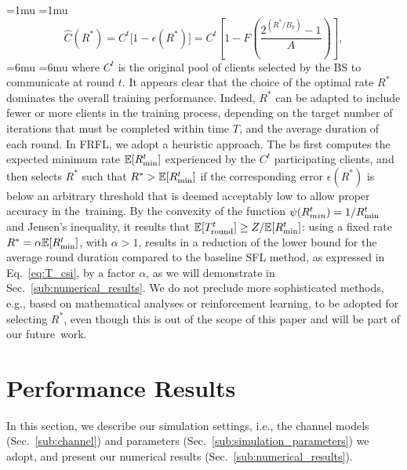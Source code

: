 \documentclass[10pt, conference, letterpaper]{IEEEtran}
\begin{document}
	\medmuskip=1mu
	\thickmuskip=1mu
	\begin{equation}
		\hat{C}(R^*) =C^t\Big[1-\epsilon(R^*)\Big]= C^t  \left[1-F\left(\frac{2^{(R^*/B_k)} -1}{A}\right)\right],
	\end{equation} 
	\medmuskip=6mu
	\thickmuskip=6mu
	where $C^t$ is the original pool of clients selected by the BS to communicate at round $t$.
	It appears clear that the choice of the optimal rate $R^*$ dominates the overall training performance.
	Indeed, $R^*$ can be adapted to include fewer or more clients in the training process, depending on the target number of iterations that must be completed within time $T$, and the average duration of each round. 
	In FRFL, we adopt a heuristic approach. The \gls{bs} first computes the expected minimum rate $\mathbb{E}[R_{\rm min}^t]$ experienced by the $C^t$ participating clients, and then selects $R^*$ such that $R^* >  \mathbb{E}[R_{\rm min}^t]$ if the corresponding error $\epsilon(R^*)$ is below an arbitrary threshold that is deemed acceptably low to allow proper accuracy in the~training.
	By the convexity of the function $\psi(R_{min}^t) = 1/R_{\rm min}^t$ and Jensen's inequality, it results that $\mathbb{E}[T_{\rm round}^t] \geq Z/\mathbb{E}[R_{\rm min}^t]$: using a fixed rate $R^* = \alpha \mathbb{E}[R_{\rm min}^t]$, with $\alpha > 1$, results in a reduction of the lower bound for the average round duration compared to the baseline SFL method, as expressed in Eq.~\eqref{eq:T_csi}, by a factor $\alpha$, as we will demonstrate in Sec.~\ref{sub:numerical_results}.
	We do not preclude more sophisticated methods, e.g., based on mathematical analyses or reinforcement learning, to be adopted for selecting $R^*$, even though this is out of the scope of this paper and will be part of our future~work.
	
	
	\section{Performance Results}
	\label{sec:analysis}
	
	In this section, we describe our simulation settings, i.e., the channel models (Sec.~\ref{sub:channel}) and parameters (Sec.~\ref{sub:simulation_parameters}) we adopt, and present our numerical results (Sec.~\ref{sub:numerical_results}).
	
\end{document}
